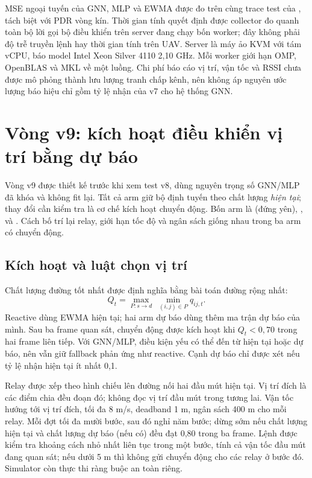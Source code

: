 MSE ngoại tuyến của GNN, MLP và EWMA được đo trên cùng trace test của
, tách biệt với PDR vòng kín. Thời gian tính quyết định được
collector đo quanh toàn bộ lời gọi bộ điều khiển trên server đang chạy bốn
worker; đây không phải độ trễ truyền lệnh hay thời gian tính trên UAV.
Server là máy ảo KVM với tám vCPU, báo model Intel Xeon Silver 4110
2,10 GHz. Mỗi worker giới hạn OMP, OpenBLAS và MKL về một luồng.
Chi phí báo cáo vị trí, vận tốc và RSSI chưa được mô phỏng thành lưu lượng
tranh chấp kênh, nên không áp nguyên ước lượng báo hiệu chỉ gồm tỷ lệ nhận
của v7 cho hệ thống GNN.

\section{Vòng v9: kích hoạt điều khiển vị trí bằng dự báo}\label{sec:m9}
Vòng v9 được thiết kế trước khi xem test v8, dùng nguyên trọng số GNN/MLP
đã khóa và không fit lại. Tất cả arm giữ bộ định tuyến  theo
chất lượng \emph{hiện tại}; thay đổi cần kiểm tra là cơ chế kích hoạt chuyển
động. Bốn arm là  (đứng yên), ,
 và . Cách bố trí lại relay, giới hạn tốc độ
và ngân sách giống nhau trong ba arm có chuyển động.

\subsection{Kích hoạt và luật chọn vị trí}
Chất lượng đường tốt nhất được định nghĩa bằng bài toán đường rộng nhất:
\begin{equation}
 Q_t=\max_{P:s\rightarrow d}\;\min_{(i,j)\in P}q_{ij,t}.
\end{equation}
Reactive dùng EWMA hiện tại; hai arm dự báo dùng thêm ma trận dự báo của
mình. Sau ba frame quan sát, chuyển động được kích hoạt khi $Q_t<0{,}70$
trong hai frame liên tiếp. Với GNN/MLP, điều kiện yếu có thể đến từ hiện tại
hoặc dự báo, nên vẫn giữ fallback phản ứng như reactive. Cạnh dự báo chỉ
được xét nếu tỷ lệ nhận hiện tại ít nhất 0,1.

Relay được xếp theo hình chiếu lên đường nối hai đầu mút hiện tại. Vị trí
đích là các điểm chia đều đoạn đó; không đọc vị trí đầu mút trong tương lai.
Vận tốc hướng tới vị trí đích, tối đa 8 m/s, deadband 1 m, ngân sách 400 m
cho mỗi relay. Mỗi đợt tối đa mười bước, sau đó nghỉ năm bước; dừng sớm nếu
chất lượng hiện tại và chất lượng dự báo (nếu có) đều đạt 0,80 trong ba frame.
Lệnh được kiểm tra khoảng cách nhỏ nhất liên tục trong một bước, tính cả
vận tốc đầu mút đang quan sát; nếu dưới 5 m thì không gửi chuyển động cho
các relay ở bước đó. Simulator còn thực thi ràng buộc an toàn riêng.

